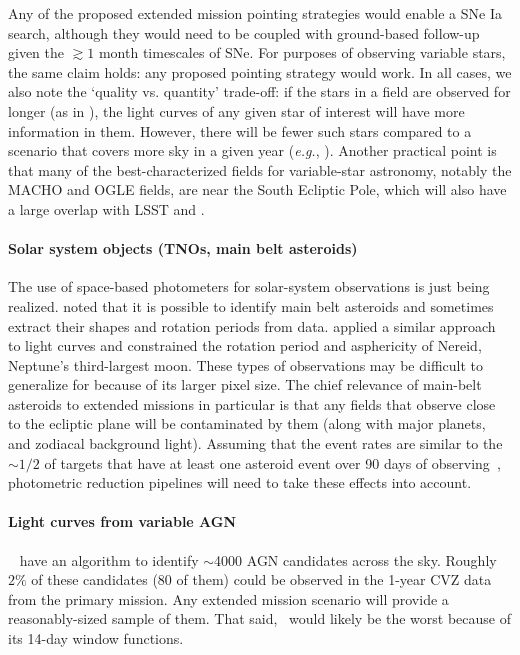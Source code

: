 Any of the proposed extended mission pointing strategies would enable a SNe Ia search, although they would need to be coupled with ground-based follow-up given the $\gtrsim 1$ month timescales of SNe.
For purposes of observing variable stars, the same claim holds: any proposed pointing strategy would work.
In all cases, we also note the `quality vs. quantity' trade-off: if the stars in a field are observed for longer (as in \npole), the light curves of any given star of interest will have more information in them.
However, there will be fewer such stars compared to a scenario that covers more sky in a given year (\textit{e.g.}, \nhemi).
Another practical point is that many of the best-characterized fields for variable-star astronomy, notably the MACHO and OGLE fields, are near the South Ecliptic Pole, which will also have a large overlap with LSST and \gaia\!.



\paragraph{Solar system objects (TNOs, main belt asteroids)}
The use of space-based photometers for solar-system observations is just being realized.
\citet{szabo_mainbelt_2015} noted that it is possible to identify main belt asteroids and sometimes extract their shapes and rotation periods from \ktwo data.
\citep{kiss_nereid_2016} applied a similar approach to \ktwo light curves and constrained the rotation period and asphericity of Nereid, Neptune's third-largest moon.
These types of observations may be difficult to generalize for \tess because of its larger pixel size. 
The chief relevance of main-belt asteroids to extended missions in particular is that any fields that observe close to the ecliptic plane will be contaminated by them (along with major planets, and zodiacal background light).
Assuming that the event rates are similar to the $\sim\!1/2$ of targets that have at least one asteroid event over 90 days of \ktwo observing~\citep{szabo_mainbelt_2015}, \tesss photometric reduction pipelines will need to take these effects into account.

\paragraph{Light curves from variable AGN}
~\citet{edelson_agn_2013} have an algorithm to identify $\sim$4000 AGN candidates across the sky.
Roughly $2\%$ of these candidates (80 of them) could be observed in the 1-year CVZ data from the primary mission.
Any extended mission scenario will provide a reasonably-sized sample of them. %
That said, \hemis\ would likely be the worst because of its 14-day window functions.




